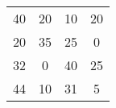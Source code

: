     \begin{tabular}{cccc}
    40      & 20      & 10      & 20 \\
    20      & 35      & 25      & 0 \\
    32      & 0       & 40      & 25 \\
    44      & 10      & 31      & 5 \bigstrut[b]\\
    \hline
    \hline
    \end{tabular}%
